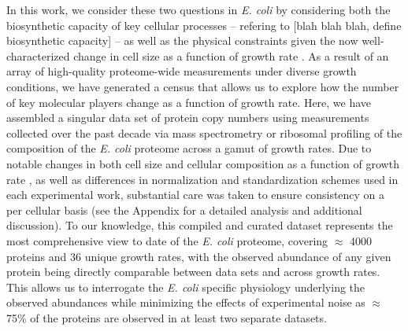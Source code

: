 In this work, we consider these two questions in \textit{E. coli} by considering
both the biosynthetic capacity of key cellular processes --  refering to [blah
blah blah, define biosynthetic capacity]   --  as well as the physical constraints given the now
well-characterized change in cell size as a function of growth rate
\cite{taheriaraghi2015, si2017, basan2015}. As a result of an array of
high-quality proteome-wide measurements under diverse growth conditions, we have
generated a census that allows us to explore how the number of key molecular
players change as a function of growth rate. Here, we have assembled a singular
data set of protein copy numbers using measurements collected over the past
decade via mass spectrometry \citep{schmidt2016, peebo2015, valgepea2013} or
ribosomal profiling \citep{li2014} of the composition of the \textit{E. coli}
proteome across a gamut of growth rates. Due to notable changes in both cell
size and cellular composition as a function of growth rate \citep{bremer2008,
taheriaraghi2015}, as well as differences in normalization and standardization
schemes used in each experimental work, substantial care was taken to ensure
consistency on a per cellular basis (see the Appendix for a detailed analysis
and additional discussion). To our knowledge, this compiled and curated dataset
represents the most comprehensive view to date of the \textit{E. coli} proteome,
covering $\approx$ 4000 proteins and 36 unique growth rates, with the observed
abundance of any given protein being directly comparable between data sets and
across growth rates. This allows us to interrogate the \textit{E. coli} specific
physiology underlying the observed abundances while minimizing the effects of
experimental noise as $\approx$ 75\% of the  proteins are observed in at least
two separate datasets.


